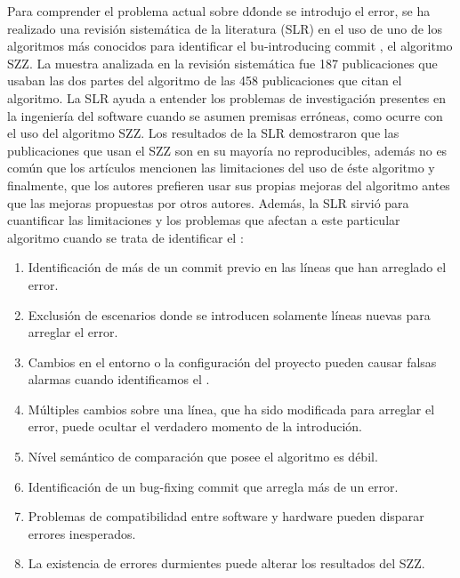 \documentclass[a4paper, 12pt]{book}
\begin{document}
Para comprender el problema actual sobre d\'donde se introdujo el error, se ha realizado una revisi\'on sistem\'atica de la literatura (SLR) en el uso de uno de los algoritmos m\'as conocidos para identificar el bu-introducing commit \BIC, el algoritmo SZZ. La muestra analizada en la revisi\'on sistem\'atica fue 187 publicaciones que usaban las dos partes del algoritmo de las 458 publicaciones que citan el algoritmo. La SLR ayuda a entender los problemas de investigaci\'on presentes en la ingenier\'ia del software cuando se asumen premisas err\'oneas, como ocurre con el uso del algoritmo SZZ. Los resultados de la SLR demostraron que las publicaciones que usan el SZZ son en su mayor\'ia no reproducibles, adem\'as no es com\'un que los art\'iculos mencionen las limitaciones del uso de \'este algoritmo y finalmente, que los autores prefieren usar sus propias mejoras del algoritmo antes que las mejoras propuestas por otros autores. Adem\'as, la SLR sirvi\'o para cuantificar las limitaciones y los problemas que afectan a este particular algoritmo cuando se trata de identificar el \BIC:
\begin{enumerate}
	\item Identificaci\'on de m\'as de un commit previo en las l\'ineas que han arreglado el error.
	\item Exclusi\'on de escenarios donde se introducen solamente l\'ineas nuevas para arreglar el error.
	\item Cambios en el entorno o la configuraci\'on del proyecto pueden causar falsas alarmas cuando identificamos el \BIC.
	\item M\'ultiples cambios sobre una l\'inea, que ha sido modificada para arreglar el error, puede ocultar el verdadero momento de la introduci\'on.
	\item N\'ivel sem\'antico de comparaci\'on que posee el algoritmo es d\'ebil.
	\item Identificaci\'on de un bug-fixing commit que arregla m\'as de un error.
	\item Problemas de compatibilidad entre software y hardware pueden disparar errores inesperados.
	\item La existencia de errores durmientes puede alterar los resultados del SZZ.
\end{enumerate}
\end{document}
